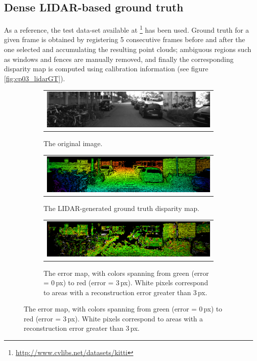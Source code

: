 \subsection{Dense \ac{LIDAR}-based ground truth}\label{ch:chapter03_01_01}

As a reference, the test data-set available at \footnote{\url{http://www.cvlibs.net/datasets/kitti}} has been used. Ground truth for a given frame is obtained by registering 5 consecutive frames before and after the one selected and accumulating the resulting point clouds; ambiguous regions such as windows and fences are manually removed, and finally the corresponding disparity map is computed using calibration information (see figure \ref{fig:cp03_lidarGT}).

\begin{figure}[h!]
        \centering
        \begin{subfigure}[b]{\textwidth}
	  \begin{tabular}{c}
	    \includegraphics[width=\textwidth]{lidarGTOriginal}
	  \end{tabular}
	  \caption{The original image.}\label{fig:cp03_lidarGTOriginal}
        \end{subfigure}%
        
        \begin{subfigure}[b]{\textwidth}
	  \begin{tabular}{c}
	    \includegraphics[width=\textwidth]{lidarGT}
	  \end{tabular}
	  \caption{The LIDAR-generated ground truth disparity map.}\label{fig:cp03_lidarGT_dispMap}
        \end{subfigure}%
        
        \begin{subfigure}[b]{\textwidth}
	  \begin{tabular}{c}
	    \includegraphics[width=\textwidth]{lidarErrMap}
	  \end{tabular}
	  \caption{The error map, with colors spanning from green (error = 0\,px) to red (error = 3\,px). White pixels correspond to areas with a reconstruction error greater than 3\,px.}\label{fig:cp03_lidarErrMap}
        \end{subfigure}%
        

\end{figure}
